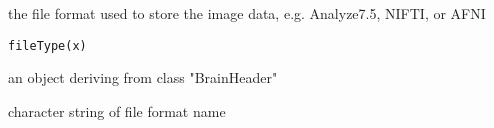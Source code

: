 \begin{Description}\relax
the file format used to store the image data, e.g. Analyze7.5, NIFTI,
or AFNI
\end{Description}
\begin{Usage}
\begin{verbatim}
fileType(x)
\end{verbatim}
\end{Usage}
\begin{Arguments}
\begin{ldescription}
\item[\code{x}] an object deriving from class "BrainHeader" 
\end{ldescription}
\end{Arguments}
\begin{Value}
character string of file format name
\end{Value}

